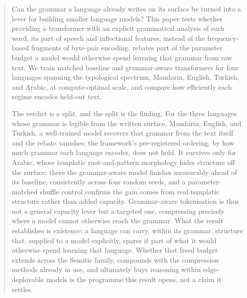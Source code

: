 \begin{abstract}
Can the grammar a language already writes on its surface be turned into a lever for building smaller language models? This paper tests whether providing a transformer with an explicit grammatical analysis of each word, its part of speech and inflectional features, instead of the frequency-based fragments of byte-pair encoding, rebates part of the parameter budget a model would otherwise spend learning that grammar from raw text. We train matched baseline and grammar-aware transformers for four languages spanning the typological spectrum, Mandarin, English, Turkish, and Arabic, at compute-optimal scale, and compare how efficiently each regime encodes held-out text.

The verdict is a split, and the split is the finding. For the three languages whose grammar is legible from the written surface, Mandarin, English, and Turkish, a well-trained model recovers that grammar from the text itself and the rebate vanishes; the framework's pre-registered ordering, by how much grammar each language encodes, does not hold. It survives only for Arabic, whose templatic root-and-pattern morphology hides structure off the surface: there the grammar-aware model finishes measurably ahead of its baseline, consistently across four random seeds, and a parameter-matched shuffle control confirms the gain comes from real templatic structure rather than added capacity. Grammar-aware tokenisation is thus not a general capacity lever but a targeted one, compressing precisely where a model cannot otherwise reach the grammar. What the result establishes is existence: a language can carry, within its grammar, structure that, supplied to a model explicitly, spares it part of what it would otherwise spend learning that language. Whether that freed budget extends across the Semitic family, compounds with the compression methods already in use, and ultimately buys reasoning within edge-deployable models is the programme this result opens, not a claim it settles.
\end{abstract}
